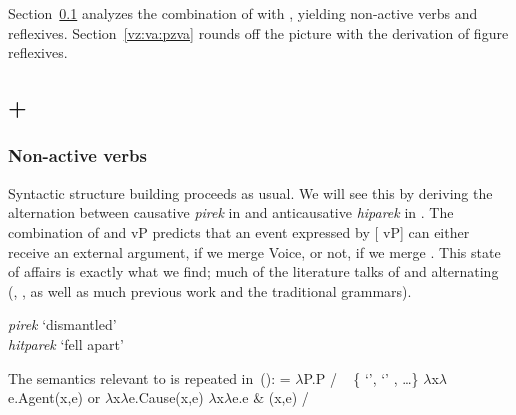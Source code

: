 Section~\ref{vz:va:vzva} analyzes the combination of {\va} with {\vz}, yielding non-active verbs and reflexives. Section~\ref{vz:va:pzva} rounds off the picture with the derivation of figure reflexives.

	\subsection{{\va} + {\vz}} \label{vz:va:vzva}
		\subsubsection{Non-active verbs} \label{vz:va:vzva:nact}
Syntactic structure building proceeds as usual. We will see this by deriving the alternation between causative \emph{pirek} in {\tpie} and anticausative \emph{hiparek} in {\thit}. The combination of {\va} and vP predicts that an event expressed by [{\va} vP] can either receive an external argument, if we merge Voice, or not, if we merge {\vz}. This state of affairs is exactly what we find; much of the literature talks of {\tpie} and {\thit} alternating (\citealt{doron03}, \citealt{arad05}, as well as much previous work and the traditional grammars).

\pex
	\a \emph{pirek} `dismantled'\\
	\a \emph{hitparek} `fell apart'\\
	
\xe

The semantics relevant to {\va} is repeated in~(\nextx):
\pex {} = 
	\a $\lambda$P.P \phantom{agent(x,e)xxx} / \trace~ \{  `',  `' , \dots \}
	\a $\lambda$x$\lambda$e.Agent(x,e) or $\lambda$x$\lambda$e.Cause(x,e)
	\a $\lambda$x$\lambda$e.e \& (x,e) / \trace~\va
\xe

